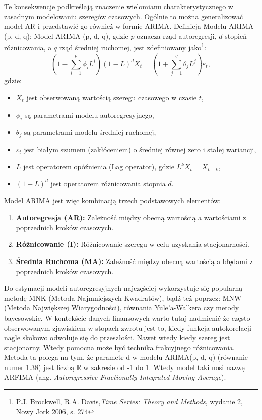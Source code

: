 \begin{enumerate}
Te konsekwencje podkreślają znaczenie wielomianu charakterystycznego w zasadnym modelowaniu szeregów czasowych. Ogólnie to można generalizować model AR i przedstawić go również w formie ARIMA. Definicja Modelu ARIMA (p, d, q):
Model ARIMA (p, d, q), gdzie \( p \) oznacza rząd autoregresji, \( d \) stopień różnicowania, a \( q \) rząd średniej ruchomej, jest zdefiniowany jako\footnote{P.J. Brockwell, R.A. Davis,\textit{Time Series: Theory and Methods}, wydanie 2, Nowy Jork 2006, s. 274}:
\begin{equation}
(1 - \sum_{i=1}^{p} \phi_i L^i) (1 - L)^d X_t = (1 + \sum_{j=1}^{q} \theta_j L^j) \varepsilon_t,
\end{equation}
gdzie:
\begin{itemize}
    \item \( X_t \) jest obserwowaną wartością szeregu czasowego w czasie \( t \),
    \item \( \phi_i \) są parametrami modelu autoregresyjnego,
    \item \( \theta_j \) są parametrami modelu średniej ruchomej,
    \item \( \varepsilon_t \) jest białym szumem (zakłóceniem) o średniej równej zero i stałej wariancji,
    \item \( L \) jest operatorem opóźnienia (Lag operator), gdzie \( L^k X_t = X_{t-k} \),
    \item \( (1 - L)^d \) jest operatorem różnicowania stopnia \( d \).
\end{itemize}

Model ARIMA jest więc kombinacją trzech podstawowych elementów:
\begin{enumerate}
    \item \textbf{Autoregresja (AR):} Zależność między obecną wartością a wartościami z poprzednich kroków czasowych.
    \item \textbf{Różnicowanie (I):} Różnicowanie szeregu w celu uzyskania stacjonarności.
    \item \textbf{Średnia Ruchoma (MA):} Zależność między obecną wartością a błędami z poprzednich kroków czasowych.
\end{enumerate}

\setlength{\parindent}{20pt} %
Do estymacji modeli autoregresyjnych najczęściej wykorzystuje się popularną metodę MNK (Metoda Najmniejszych Kwadratów), bądź też poprzez: MNW (Metoda Największej Wiarygodności), równania Yule'a-Walkera czy metody bayesowskie.
W kontekście danych finansowych warto tutaj nadmienić że często obserwowanym zjawiskiem w stopach zwrotu jest to, kiedy funkcja autokorelacji nagle skokowo odwołuje się do przeszłości. Nawet wtedy kiedy szereg jest stacjonarny. Wtedy pomocna może być technika frakcyjnego różnicowania. Metoda ta polega na tym, że parametr d w modelu ARIMA(p, d, q) (równanie numer 1.38) jest liczbą \(\mathbb{R} \)  w zakresie od -1 do 1. Wtedy model taki nosi nazwę ARFIMA (ang. \textit{Autoregressive Fractionally Integrated Moving Average}).



\end{enumerate}
